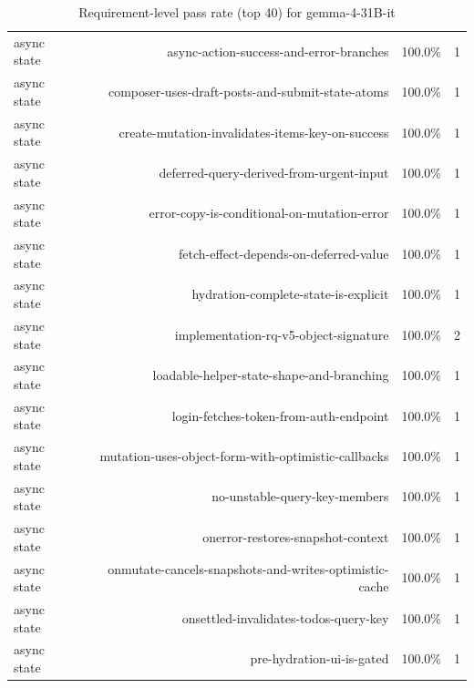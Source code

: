 \begin{table}[htbp]
\begin{tabular}{lrrr}
async state & async-action-success-and-error-branches & 100.0\% & 1 \\
async state & composer-uses-draft-posts-and-submit-state-atoms & 100.0\% & 1 \\
async state & create-mutation-invalidates-items-key-on-success & 100.0\% & 1 \\
async state & deferred-query-derived-from-urgent-input & 100.0\% & 1 \\
async state & error-copy-is-conditional-on-mutation-error & 100.0\% & 1 \\
async state & fetch-effect-depends-on-deferred-value & 100.0\% & 1 \\
async state & hydration-complete-state-is-explicit & 100.0\% & 1 \\
async state & implementation-rq-v5-object-signature & 100.0\% & 2 \\
async state & loadable-helper-state-shape-and-branching & 100.0\% & 1 \\
async state & login-fetches-token-from-auth-endpoint & 100.0\% & 1 \\
async state & mutation-uses-object-form-with-optimistic-callbacks & 100.0\% & 1 \\
async state & no-unstable-query-key-members & 100.0\% & 1 \\
async state & onerror-restores-snapshot-context & 100.0\% & 1 \\
async state & onmutate-cancels-snapshots-and-writes-optimistic-cache & 100.0\% & 1 \\
async state & onsettled-invalidates-todos-query-key & 100.0\% & 1 \\
async state & pre-hydration-ui-is-gated & 100.0\% & 1 \\
\bottomrule
\end{tabular}
\caption{Requirement-level pass rate (top 40) for gemma-4-31B-it}
\end{table}
